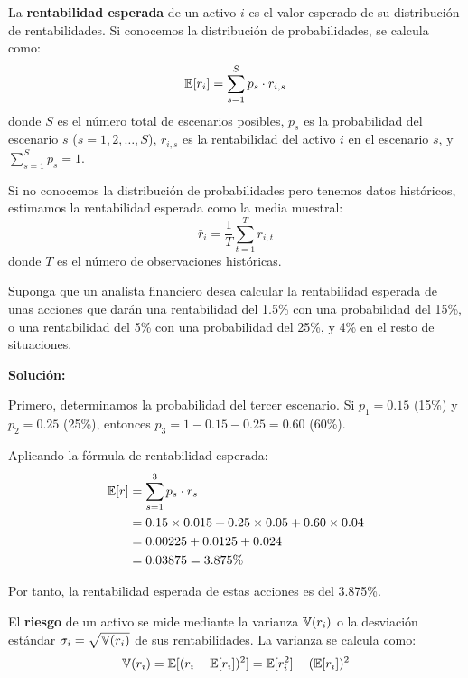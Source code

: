 \begin{definicion}
La \textbf{rentabilidad esperada} de un activo $i$ es el valor esperado de su distribución de rentabilidades. Si conocemos la distribución de probabilidades, se calcula como:
\begin{equation}
\mathbb{E}[r_i] = \sum_{s=1}^{S} p_s \cdot r_{i,s}
\end{equation}
donde $S$ es el número total de escenarios posibles, $p_s$ es la probabilidad del escenario $s$ ($s = 1, 2, \ldots, S$), $r_{i,s}$ es la rentabilidad del activo $i$ en el escenario $s$, y $\sum_{s=1}^{S} p_s = 1$.
\end{definicion}

Si no conocemos la distribución de probabilidades pero tenemos datos históricos, estimamos la rentabilidad esperada como la media muestral:
\begin{equation}
\bar{r}_i = \frac{1}{T} \sum_{t=1}^{T} r_{i,t}
\end{equation}
donde $T$ es el número de observaciones históricas.

\begin{ejemplo}
Suponga que un analista financiero desea calcular la rentabilidad esperada de unas acciones que darán una rentabilidad del 1.5\% con una probabilidad del 15\%, o una rentabilidad del 5\% con una probabilidad del 25\%, y 4\% en el resto de situaciones.

\textbf{Solución:}

Primero, determinamos la probabilidad del tercer escenario. Si $p_1 = 0.15$ (15\%) y $p_2 = 0.25$ (25\%), entonces $p_3 = 1 - 0.15 - 0.25 = 0.60$ (60\%).

Aplicando la fórmula de rentabilidad esperada:
\begin{align*}
\mathbb{E}[r] &= \sum_{s=1}^{3} p_s \cdot r_s \\
&= 0.15 \times 0.015 + 0.25 \times 0.05 + 0.60 \times 0.04 \\
&= 0.00225 + 0.0125 + 0.024 \\
&= 0.03875 = 3.875\%
\end{align*}

Por tanto, la rentabilidad esperada de estas acciones es del 3.875\%.
\end{ejemplo}

\begin{definicion}
El \textbf{riesgo} de un activo se mide mediante la varianza $\mathbb{V}(r_i)$ o la desviación estándar $\sigma_i = \sqrt{\mathbb{V}(r_i)}$ de sus rentabilidades. La varianza se calcula como:
\begin{equation}
\mathbb{V}(r_i) = \mathbb{E}[(r_i - \mathbb{E}[r_i])^2] = \mathbb{E}[r_i^2] - (\mathbb{E}[r_i])^2
\end{equation}
\end{definicion}

